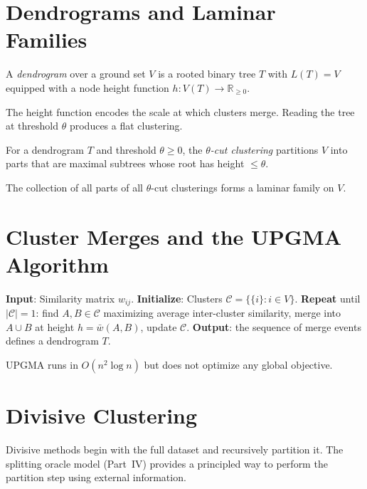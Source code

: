 \section{Dendrograms and Laminar Families}

\begin{definition}[Dendrogram]
A \emph{dendrogram} over a ground set $V$ is a rooted binary tree $T$ with $L(T) = V$ equipped with a node height function $h : V(T) \to \mathbb{R}_{\geq 0}$.
\end{definition}

The height function encodes the scale at which clusters merge. Reading the tree at threshold $\theta$ produces a flat clustering.

\begin{definition}
For a dendrogram $T$ and threshold $\theta \geq 0$, the \emph{$\theta$-cut clustering} partitions $V$ into parts that are maximal subtrees whose root has height $\leq \theta$.
\end{definition}

\begin{proposition}
The collection of all parts of all $\theta$-cut clusterings forms a laminar family on $V$.
\end{proposition}

\section{Cluster Merges and the UPGMA Algorithm}

\begin{algorithm}
\label{alg:upgma}
\textbf{Input}: Similarity matrix $w_{ij}$.
\textbf{Initialize}: Clusters $\mathcal{C} = \{\{i\} : i \in V\}$.
\textbf{Repeat} until $|\mathcal{C}| = 1$: find $A, B \in \mathcal{C}$ maximizing average inter-cluster similarity, merge into $A \cup B$ at height $h = \bar{w}(A,B)$, update $\mathcal{C}$.
\textbf{Output}: the sequence of merge events defines a dendrogram $T$.
\end{algorithm}

UPGMA runs in $O(n^2 \log n)$ but does not optimize any global objective.

\section{Divisive Clustering}

Divisive methods begin with the full dataset and recursively partition it. The splitting oracle model (Part~IV) provides a principled way to perform the partition step using external information.

